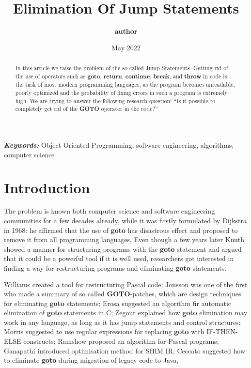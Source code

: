 \documentclass[two column]{article}
\title{\textbf{Elimination Of Jump Statements}}
\author{\textbf{author}}
\date{May 2022}
\providecommand{\keywords}[1]
{
  \small
  \textbf{\textit{Keywords:}} #1
}
\begin{document}
\maketitle

\begin{abstract}
In this article we raise the problem of the so-called Jump Statements. Getting rid of the use of operators such as \textbf{goto}, \textbf{return}, \textbf{continue}, \textbf{break}, and \textbf{throw} in code is the task of most modern programming languages, as the program becomes unreadable, poorly optimized and the probability of fixing errors in such a program is extremely high. 
We are trying to answer the following research question: “Is it possible to completely get rid of the \textbf{GOTO} operator in the code?”

\end{abstract}

\keywords{Object-Oriented Programming, software engineering, algorithms, computer science}


\section{Introduction}
The problem is known both computer science and software engineering communities for a few decades already, while it was firstly formulated by Dijkstra in 1968: he affirmed that the use of \textbf{goto} has disastrous effect and proposed to remove it from all programming languages, Even though a few years later Knuth showed a manner for structuring programs with the \textbf{goto} statement and argued that it could be a powerful tool if it is well used, researchers got interested in finding a way for restructuring programs and eliminating \textbf{goto} statements.

Williams created a tool for restructuring Pascal code; Jonsson was one of the first who made a summary of so called \textbf{GOTO}-patches, which are design techniques for eliminating \textbf{goto} statements; Erosa suggested an algorithm fir automatic elimination of \textbf{goto} statements in C; Zegour explained how \textbf{goto} elimination may work in any language, as long as it has jump statements and control structures; Morris suggested to use regular expressions for replacing \textbf{goto} with IF-THEN-ELSE constructs; Ramshow proposed an algorithm for Pascal programs; Ganapathi introduced optimisation method for SHIM IR; Ceccato suggested how to eliminate \textbf{goto} during migration of legacy code to Java,
\end{document}
